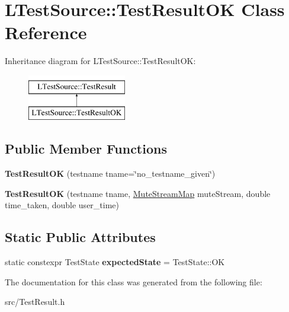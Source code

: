 \hypertarget{class_l_test_source_1_1_test_result_o_k}{\section{L\-Test\-Source\-:\-:Test\-Result\-O\-K Class Reference}
\label{class_l_test_source_1_1_test_result_o_k}
}
Inheritance diagram for L\-Test\-Source\-:\-:Test\-Result\-O\-K\-:\begin{figure}[H]
\begin{center}
\leavevmode
\includegraphics[height=2.000000cm]{class_l_test_source_1_1_test_result_o_k}
\end{center}
\end{figure}
\subsection*{Public Member Functions}
\begin{DoxyCompactItemize}
\item 
\hypertarget{class_l_test_source_1_1_test_result_o_k_a659cfdad69fd7a82caa4754bf4b83102}{{\bfseries Test\-Result\-O\-K} (testname tname=\char`\"{}no\-\_\-testname\-\_\-given\char`\"{})}\label{class_l_test_source_1_1_test_result_o_k_a659cfdad69fd7a82caa4754bf4b83102}

\item 
\hypertarget{class_l_test_source_1_1_test_result_o_k_a97e2184aa8e4046f552e84d1bbd66b8d}{{\bfseries Test\-Result\-O\-K} (testname tname, \hyperlink{class_l_test_source_1_1_mute_stream_map}{Mute\-Stream\-Map} mute\-Stream, double time\-\_\-taken, double user\-\_\-time)}\label{class_l_test_source_1_1_test_result_o_k_a97e2184aa8e4046f552e84d1bbd66b8d}

\end{DoxyCompactItemize}
\subsection*{Static Public Attributes}
\begin{DoxyCompactItemize}
\item 
\hypertarget{class_l_test_source_1_1_test_result_o_k_a6a112a7d2616eb73748566110e1f1164}{static constexpr Test\-State {\bfseries expected\-State} = Test\-State\-::\-O\-K}\label{class_l_test_source_1_1_test_result_o_k_a6a112a7d2616eb73748566110e1f1164}

\end{DoxyCompactItemize}


The documentation for this class was generated from the following file\-:\begin{DoxyCompactItemize}
\item 
src/Test\-Result.\-h\end{DoxyCompactItemize}
